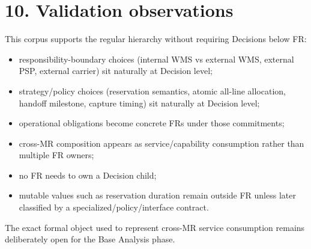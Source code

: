\documentclass[
  10pt,
]{article}
\providecommand{\tightlist}{%
  \setlength{\itemsep}{0pt}\setlength{\parskip}{0pt}}
\begin{document}
\section{10. Validation observations}\label{10-validation-observations}

This corpus supports the regular hierarchy without requiring Decisions
below FR:

\begin{itemize}
\tightlist
\item
  responsibility-boundary choices (internal WMS vs external WMS,
  external PSP, external carrier) sit naturally at Decision level;
\item
  strategy/policy choices (reservation semantics, atomic all-line
  allocation, handoff milestone, capture timing) sit naturally at
  Decision level;
\item
  operational obligations become concrete FRs under those commitments;
\item
  cross-MR composition appears as service/capability consumption rather
  than multiple FR owners;
\item
  no FR needs to own a Decision child;
\item
  mutable values such as reservation duration remain outside FR unless
  later classified by a specialized/policy/interface contract.
\end{itemize}

The exact formal object used to represent cross-MR service consumption
remains deliberately open for the Base Analysis phase.
\end{document}
